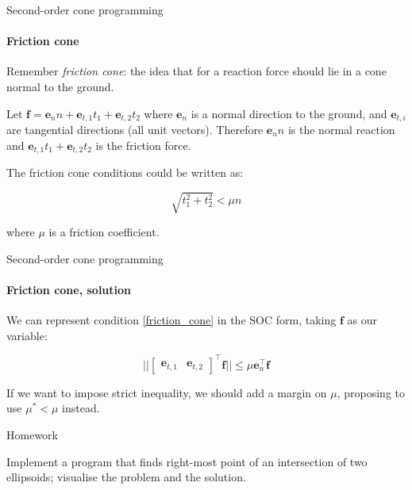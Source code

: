 \documentclass{beamer}
\begin{document}
\begin{frame}{Second-order cone programming}
\framesubtitle{Friction cone}
\begin{flushleft}

Remember \emph{friction cone}: the idea that for a reaction force should lie in a cone normal to the ground. 

\bigskip

Let $\mathbf{f} = \mathbf{e}_n n + \mathbf{e}_{t, 1} t_1 + \mathbf{e}_{t, 2} t_2$  where $\mathbf{e}_n$ is a normal direction to the ground, and $\mathbf{e}_{t, i}$ are tangential directions (all unit vectors). Therefore $\mathbf{e}_n n$ is the normal reaction and $ \mathbf{e}_{t, 1} t_1 + \mathbf{e}_{t, 2} t_2$ is the friction force.

\bigskip

The friction cone conditions could be written as:

\begin{equation}
\label{friction_cone}
    \sqrt{t_1^2 + t_2^2} < \mu n
\end{equation}

where $\mu$ is a friction coefficient.
 
\end{flushleft}
\end{frame}



\begin{frame}{Second-order cone programming}
\framesubtitle{Friction cone, solution}
\begin{flushleft}

We can represent condition \eqref{friction_cone} in the SOC form, taking $\mathbf{f}$ as our variable:

\begin{equation}
    || \begin{bmatrix} \mathbf{e}_{t, 1} & \mathbf{e}_{t, 2} \end{bmatrix}^\top \mathbf{f} || \leq \mu \mathbf{e}_n^\top \mathbf{f}
\end{equation}

\bigskip

If we want to impose strict inequality, we should add a margin on $\mu$, proposing to use $\mu^* < \mu$ instead.
 
\end{flushleft}
\end{frame}





\begin{frame}{Homework}
\begin{flushleft}

Implement a program that finds right-most point of an intersection of two ellipsoids; visualise the problem and the solution.

\end{flushleft}
\end{frame}
\end{document}
